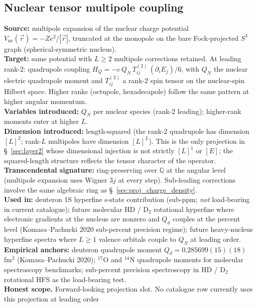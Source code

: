 \documentclass[11pt]{article}
\begin{document}
\subsection{Nuclear tensor multipole coupling}
\label{sec:proj_tensor_multipole}
\textbf{Source:} multipole expansion of the nuclear charge potential
$V_\text{ne}(\vec{r}) = -Ze^2/|\vec{r}|$, truncated at the
monopole on the bare Fock-projected $S^3$ graph (spherical-symmetric
nucleus).\\
\textbf{Target:} same potential with $L \geq 2$ multipole
corrections retained.  At leading rank-2: quadrupole coupling
$H_Q = -e\,Q_N\,T^{(2)}_{ij}\,(\partial_i E_j)/6$, with $Q_N$ the
nuclear electric quadrupole moment and $T^{(2)}_{ij}$ a rank-2
spin tensor on the nuclear-spin Hilbert space.  Higher ranks
(octupole, hexadecapole) follow the same pattern at higher angular
momentum.\\
\textbf{Variables introduced:} $Q_N$ per nuclear species (rank-2
leading); higher-rank moments enter at higher $L$.\\
\textbf{Dimension introduced:} length-squared (the rank-2
quadrupole has dimension $[L]^2$; rank-$L$ multipoles have dimension
$[L]^L$).  This is the only projection in \S~\ref{sec:layer2} whose
dimensional injection is not strictly $[L]^1$ or $[E]$; the
squared-length structure reflects the tensor character of the
operator.\\
\textbf{Transcendental signature:} ring-preserving over $\mathbb{Q}$
at the angular level (multipole expansion uses Wigner $3j$ at every
step).  Sub-leading corrections involve the same algebraic ring as
\S~\ref{sec:proj_charge_density}.\\
\textbf{Used in:} deuteron 1S hyperfine s-state contribution
(sub-ppm; \emph{not} load-bearing in current catalogue); future
molecular HD / D$_2$ rotational hyperfine where electronic
gradients at the nucleus are nonzero and $Q_d$ couples at the
percent level (Komasa--Pachucki 2020 sub-percent precision regime);
future heavy-nucleus hyperfine spectra where $L \geq 1$ valence
orbitals couple to $Q_N$ at leading order.\\
\textbf{Empirical anchors:} deuteron quadrupole moment
$Q_d = 0.285699(15)(18)$ fm$^2$ (Komasa--Pachucki 2020); $^{17}$O
and $^{14}$N quadrupole moments for molecular spectroscopy
benchmarks; sub-percent precision spectroscopy in HD / D$_2$
rotational HFS as the load-bearing test.\\
\textbf{Honest scope.}  Forward-looking projection slot.  No
catalogue row currently uses this projection at leading order
\end{document}
